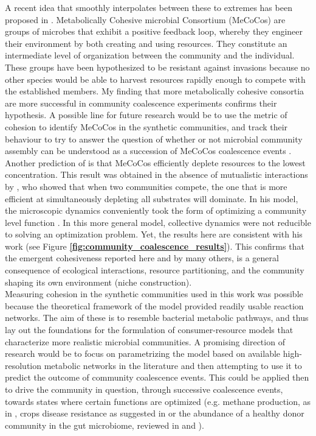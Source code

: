 \documentclass[titlepage,11pt]{article}
\begin{document}
\begin{linenumbers}
\begin{singlespace}
	A recent idea that smoothly interpolates between these to extremes has been proposed in \citep{Pascual-Garcia2020}. Metabolically Cohesive microbial Consortium (MeCoCos) are groups of microbes that exhibit a positive feedback loop, whereby they engineer their environment by both creating and using resources. They constitute an intermediate level of organization between the community and the individual. These groups have been hypothesized to be resistant against invasions because no other species would be able to harvest resources rapidly enough to compete with the established members. My finding that more metabolically cohesive consortia are more successful in community coalescence experiments confirms their hypothesis. A possible line for future research would be to use the metric of cohesion to identify MeCoCos in the synthetic communities, and track their behaviour to try to answer the question of whether or not microbial community assembly can be understood as a succession of MeCoCos coalescence events .\\ 
	Another prediction of \citet{Pascual-Garcia2020} is that MeCoCos efficiently deplete resources to the lowest concentration. This result was obtained in the absence of mutualistic interactions by \citet{Tikhonov2016}, who showed that when two communities compete, the one that is more efficient at simultaneously depleting all substrates will dominate. In his model, the microscopic dynamics conveniently took the form of optimizing a community level function \citep{Arthur1969}. In this more general model, collective dynamics were not reducible to solving an optimization problem. Yet, the results here are consistent with his work (see Figure \textbf{\ref{fig:community_coalescence_results}}). This confirms that the emergent cohesiveness reported here and by many others, is a general consequence of ecological interactions, resource partitioning, and the community shaping its own environment (niche construction).\\
	Measuring cohesion in the synthetic communities used in this work was possible because the theoretical framework of the model provided readily usable reaction networks. The aim of these is to resemble bacterial metabolic pathways, and thus lay out the foundations for the formulation of consumer-resource models that characterize more realistic microbial communities. A promising direction of research would be to focus on parametrizing the model based on available high-resolution metabolic networks in the literature and then attempting to use it to predict the outcome of community coalescence events. This could be applied then to drive the community in question, through successive coalescence events, towards states where certain functions are optimized (e.g. methane production, as in \citet{Rillig2016}, crops disease resistance as suggested in \citet{Calderon2017} or the abundance of a healthy donor community in the gut microbiome, reviewed in \citet{Wilson2019} and \citet{Wang2019}).
	

\end{singlespace}
\end{linenumbers}
\end{document}

